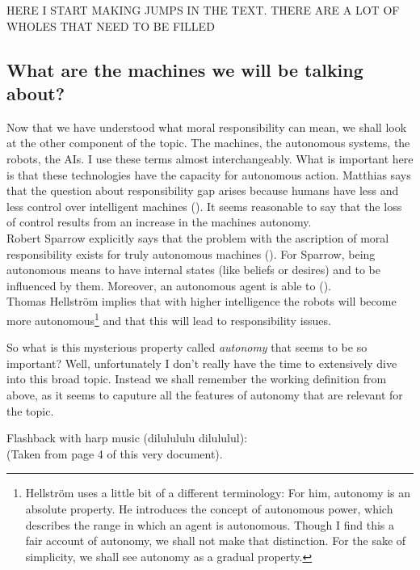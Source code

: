 \documentclass{article}
\begin{document}
 HERE I START MAKING JUMPS IN THE TEXT. THERE ARE A LOT OF WHOLES THAT NEED TO
 BE FILLED
\subsection{What are the machines we will be talking about?}

Now that we have understood what moral responsibility can mean, we shall look at
the other component of the topic. The machines, the autonomous systems, the
robots, the AIs. I use these terms almost interchangeably. What is important
here is that these technologies have the capacity for autonomous action.
Matthias says that the question about responsibility gap arises because humans
have less and less control over intelligent machines (\cite[p.
175]{Matthias_2004}). It seems reasonable to say that the loss of control
results from an increase in the machines autonomy.\\ 
Robert Sparrow explicitly says that the problem with the ascription of moral
responsibility exists for truly autonomous machines (\cite[p.
64-65]{sparrow2007killer}). For Sparrow, being autonomous means to have internal
states (like beliefs or desires) and to be influenced by them.  Moreover, an
autonomous agent is able to 
(\cite[p. 65]{sparrow2007killer}).\\
Thomas Hellström implies that with higher intelligence the robots will
become more autonomous\footnote{Hellström uses a little bit of a
		different terminology: For him, autonomy is an absolute
		property. He introduces the concept of autonomous power, which
		describes the range in which an agent is autonomous. Though I
		find this a fair account of autonomy, we shall not make that
		distinction. For the sake of simplicity, we shall see autonomy
as a gradual property.} and that this will lead to responsibility issues.

So what is this mysterious property called \textit{autonomy} that seems to be so
important? Well, unfortunately I don't really have the time to extensively dive
into this broad topic. Instead we shall remember the working definition from
above, as it seems to caputure all the features of autonomy that are relevant
for the topic.

Flashback with harp music (dilulululu dilululul):\\
 (Taken
from page 4 of this very document).
\end{document}
